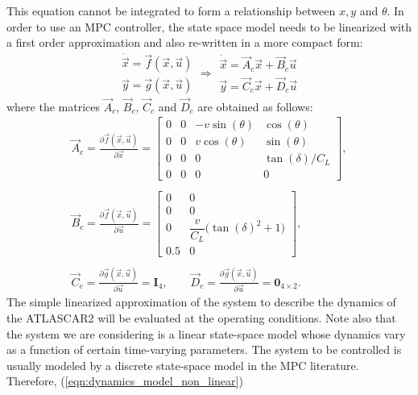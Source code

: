 This equation cannot be integrated to form a
relationship between $x,y$ and $\theta$. In order to use an MPC controller, the state space model needs to be linearized with a first order approximation and also re-written in a more compact form:
\begin{equation}
\label{eqn:dynamics_model_non_linear}
\begin{array}{llll}
\dot{\vec{x}} = \vec{f}(\vec{x},\vec{u})\\
\vec{y} = \vec{g}(\vec{x},\vec{u})
\end{array} \Longrightarrow
\begin{array}{ll}
\dot{\vec{x}} =\vec{A}_c \vec{x}+ \vec{B}_c \vec{u}\\
\vec{y} =\vec{C}_c \vec{x} + \vec{D}_c \vec{u}
\end{array}
\end{equation}
where the matrices $\vec{A}_c$, $\vec{B}_c$, $\vec{C}_c$ and $\vec{D}_c$ are obtained as follows:
\begin{equation}
\begin{array}{ccc}
\vec{A}_c=\displaystyle\frac{\partial \vec{f}(\vec{x},\vec{u})}{\partial \vec{x}}=\begin{bmatrix}
0&0&-v\sin(\theta)&\cos(\theta)\\
0&0&v\cos(\theta)&\sin(\theta)\\
0&0&0&\tan(\delta)/C_L\\
0&0&0&0
\end{bmatrix},
\\\\
\vec{B}_c=\displaystyle\frac{\partial \vec{f}(\vec{x},\vec{u})}{\partial \vec{u}}=\begin{bmatrix}
0&0\\
0&0\\
0&\dfrac{v}{C_L}\big(\tan(\delta)^2+1\big)\\
0.5&0
\end{bmatrix},
\\\\
\vec{C}_c=\displaystyle\frac{\partial \vec{g}(\vec{x},\vec{u})}{\partial \vec{u}} = \mathbf{I}_4, 
\qquad
\vec{D}_c=\frac{\partial \vec{g}(\vec{x},\vec{u})}{\partial \vec{u}}=\mathbf{0}_{4\times2}.
\end{array}
\end{equation} 
The simple linearized approximation of the system to describe the dynamics of the ATLASCAR2 will be evaluated at the operating conditions. Note also that the system we are considering is a linear state-space model whose dynamics vary as a function of certain time-varying parameters. The system to be controlled is usually modeled by a discrete state-space model in the MPC literature. Therefore, (\ref{eqn:dynamics_model_non_linear})
